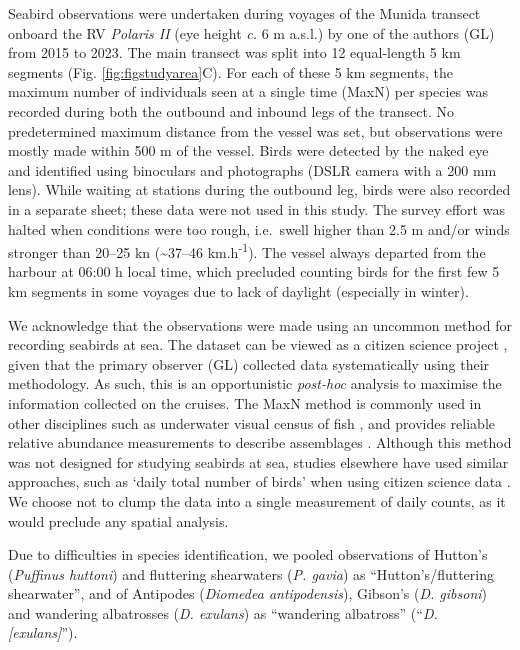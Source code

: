 \documentclass[preprint, 3p, authoryear]{elsarticle} %
\begin{document}
Seabird observations were undertaken during voyages of the Munida transect onboard the RV \emph{Polaris II} (eye height \emph{c.} 6 m a.s.l.) by one of the authors (GL) from 2015 to 2023. The main transect was split into 12 equal-length 5 km segments (Fig. \ref{fig:figstudyarea}{C}). For each of these 5 km segments, the maximum number of individuals seen at a single time (MaxN) per species was recorded during both the outbound and inbound legs of the transect. No predetermined maximum distance from the vessel was set, but observations were mostly made within 500 m of the vessel. Birds were detected by the naked eye and identified using binoculars and photographs (DSLR camera with a 200 mm lens). While waiting at stations during the outbound leg, birds were also recorded in a separate sheet; these data were not used in this study. The survey effort was halted when conditions were too rough, i.e.~swell higher than 2.5 m and/or winds stronger than 20--25 kn (\textasciitilde37--46 km.h\textsuperscript{-1}). The vessel always departed from the harbour at 06:00 h local time, which precluded counting birds for the first few 5 km segments in some voyages due to lack of daylight (especially in winter). 

We acknowledge that the observations were made using an uncommon method for recording seabirds at sea. The dataset can be viewed as a citizen science project \citep{dickinson2010, peters2015}, given that the primary observer (GL) collected data systematically using their methodology. As such, this is an opportunistic \emph{post-hoc} analysis to maximise the information collected on the cruises. The MaxN method is commonly used in other disciplines such as underwater visual census of fish \citep{whitmarsh2017, schmid2017, mitchell2021, lima2025}, and provides reliable relative abundance measurements to describe assemblages \citep{willis2000, harvey2007}. Although this method was not designed for studying seabirds at sea, studies elsewhere have used similar approaches, such as `daily total number of birds' when using citizen science data \citep[e.g.][]{gorta2019, martin2020}. We choose not to clump the data into a single measurement of daily counts, as it would preclude any spatial analysis.

Due to difficulties in species identification, we pooled observations of Hutton's (\emph{Puffinus huttoni}) and fluttering shearwaters (\emph{P. gavia}) as ``Hutton's/fluttering shearwater'', and of Antipodes (\emph{Diomedea antipodensis}), Gibson's (\emph{D. gibsoni}) and wandering albatrosses (\emph{D. exulans}) as ``wandering albatross'' (``\emph{D. {[}exulans{]}}'').
\end{document}
